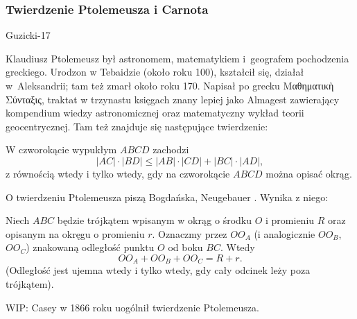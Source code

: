 \subsubsection{Twierdzenie Ptolemeusza i Carnota}
Guzicki-17

Klaudiusz Ptolemeusz był astronomem, matematykiem i~geografem pochodzenia greckiego.
Urodzon w Tebaidzie (około roku 100), kształcił się, działał w~Aleksandrii; tam też zmarł około roku 170.
Napisał po grecku Μαθηματικὴ Σύνταξις, traktat w trzynastu księgach znany lepiej jako Almagest zawierający kompendium wiedzy astronomicznej oraz matematyczny wykład teorii geocentrycznej.
Tam też znajduje się następujące twierdzenie:

\begin{theorem}[Ptolemeusza, 140]
    W czworokącie wypukłym $ABCD$ zachodzi
    \begin{equation}
        |AC| \cdot |BD| \le |AB| \cdot |CD| + |BC| \cdot |AD|,
    \end{equation}
    z równością wtedy i tylko wtedy, gdy na czworokącie $ABCD$ można opisać okrąg.
\end{theorem}

O twierdzeniu Ptolemeusza piszą Bogdańska, Neugebauer \cite[s. 62, 63]{neugebauer_2018}.
Wynika z niego:

\begin{theorem}[Carnot, 1???]
    Niech $ABC$ będzie trójkątem wpisanym w okrąg o środku $O$ i promieniu $R$ oraz opisanym na okręgu o promieniu $r$.
    Oznaczmy przez $OO_A$ (i analogicznie $OO_B$, $OO_C$) znakowaną odległość punktu $O$ od boku $BC$.
    Wtedy 
    \begin{equation}
        OO_A + OO_B + OO_C = R + r.
    \end{equation}
    (Odległość jest ujemna wtedy i tylko wtedy, gdy cały odcinek leży poza trójkątem).
\end{theorem}


\color{red}

WIP: Casey w 1866 roku uogólnił twierdzenie Ptolemeusza.

\color{black}

%